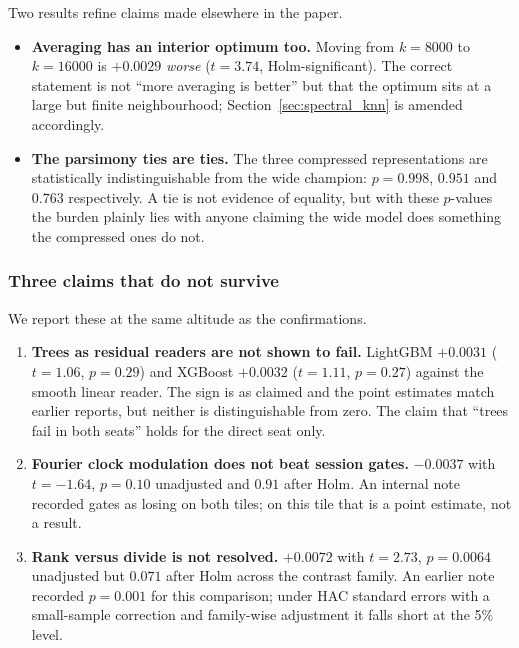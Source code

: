 Two results refine claims made elsewhere in the paper.

\begin{itemize}
  \item \textbf{Averaging has an interior optimum too.} Moving from $k = 8000$
    to $k = 16000$ is $+0.0029$ \emph{worse} ($t = 3.74$, Holm-significant). The
    correct statement is not ``more averaging is better'' but that the optimum
    sits at a large but finite neighbourhood; Section~\ref{sec:spectral_knn}
    is amended accordingly.
  \item \textbf{The parsimony ties are ties.} The three compressed
    representations are statistically indistinguishable from the wide champion:
    $p = 0.998$, $0.951$ and $0.763$ respectively. A tie is not evidence of
    equality, but with these $p$-values the burden plainly lies with anyone
    claiming the wide model does something the compressed ones do not.
\end{itemize}

\subsubsection{Three claims that do not survive}
\label{sec:not_surviving}

We report these at the same altitude as the confirmations.

\begin{enumerate}
  \item \textbf{Trees as residual readers are not shown to fail.} LightGBM
    $+0.0031$ ($t = 1.06$, $p = 0.29$) and XGBoost $+0.0032$ ($t = 1.11$,
    $p = 0.27$) against the smooth linear reader. The sign is as claimed and
    the point estimates match earlier reports, but neither is distinguishable
    from zero. The claim that ``trees fail in both seats'' holds for the direct
    seat only.
  \item \textbf{Fourier clock modulation does not beat session gates.}
    $-0.0037$ with $t = -1.64$, $p = 0.10$ unadjusted and $0.91$ after Holm.
    An internal note recorded gates as losing on both tiles; on this tile that
    is a point estimate, not a result.
  \item \textbf{Rank versus divide is not resolved.} $+0.0072$ with
    $t = 2.73$, $p = 0.0064$ unadjusted but $0.071$ after Holm across the
    contrast family. An earlier note recorded $p = 0.001$ for this comparison;
    under HAC standard errors with a small-sample correction and family-wise
    adjustment it falls short at the 5\% level.
\end{enumerate}

